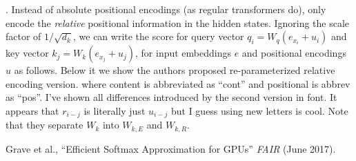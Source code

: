 \documentclass[11pt]{article}
\begin{document}
. Instead of absolute positional encodings (as regular transformers do), only encode the \textit{relative} positional information in the hidden states. Ignoring the scale factor of $1/\sqrt{d_{k}}$, we can write the score for query vector $q_i = W_q (e_{x_i} + u_i)$ and key vector $k_j = W_k (e_{x_j} + u_j)$, for input embeddings $e$ and positional encodings $u$ as follows. Below it we show the authors proposed re-parameterized relative encoding version.
where content is abbreviated as ``cont'' and positional is abbrev as ``pos''. I've shown all differences introduced by the second version in  font. It appears that $r_{i - j}$ is literally just $u_{i - j}$ but I guess using new letters is cool. Note that they separate $W_k$ into  $W_{k, E}$ and  $W_{k, R}$. 


\vspace{-1em}
{\footnotesize Grave et al., ``Efficient Softmax Approximation for GPUs'' \textit{FAIR} (June 2017).}
\end{document}
